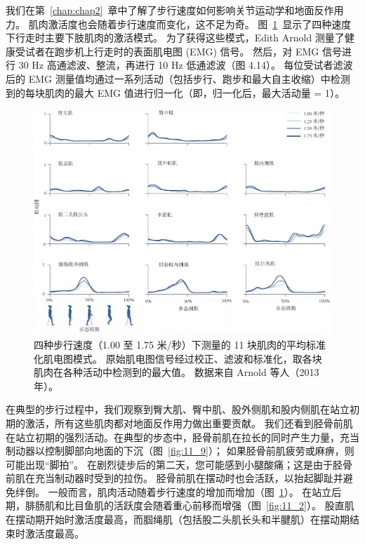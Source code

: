 我们在第~\ref{chap:chap2}~章中了解了步行速度如何影响关节运动学和地面反作用力。
肌肉激活度也会随着步行速度而变化，这不足为奇。
图~\ref{fig:11_8}~显示了四种速度下行走时主要下肢肌肉的激活模式。
为了获得这些模式，Edith Arnold 测量了健康受试者在跑步机上行走时的表面肌电图 (EMG) 信号。
然后，对 EMG 信号进行 30 Hz 高通滤波、整流，再进行 10 Hz 低通滤波（图 4.14）。
每位受试者滤波后的 EMG 测量值均通过一系列活动（包括步行、跑步和最大自主收缩）中检测到的每块肌肉的最大 EMG 值进行归一化（即，归一化后，最大活动量 = 1）。


\begin{figure}[!htb]
	\centering
	\includegraphics[width=1.0\linewidth]{chap11/11_8}
	\caption{四种步行速度（1.00 至 1.75 米/秒）下测量的 11 块肌肉的平均标准化肌电图模式。
		原始肌电图信号经过校正、滤波和标准化，取各块肌肉在各种活动中检测到的最大值。
		数据来自 Arnold 等人（2013 年）。 \label{fig:11_8}}
\end{figure}


在典型的步行过程中，我们观察到臀大肌、臀中肌、股外侧肌和股内侧肌在站立初期的激活，所有这些肌肉都对地面反作用力做出重要贡献。
我们还看到胫骨前肌在站立初期的强烈活动。在典型的步态中，胫骨前肌在拉长的同时产生力量，充当制动器以控制脚部向地面的下沉（图~\ref{fig:11_9}）；
如果胫骨前肌疲劳或麻痹，则可能出现“脚拍”。
在剧烈徒步后的第二天，您可能感到小腿酸痛；这是由于胫骨前肌在充当制动器时受到的拉伤。
胫骨前肌在摆动时也会活跃，以抬起脚趾并避免绊倒。
一般而言，肌肉活动随着步行速度的增加而增加（图~\ref{fig:11_8}）。
在站立后期，腓肠肌和比目鱼肌的活跃度会随着重心前移而增强（图~\ref{fig:11_2}）。
股直肌在摆动期开始时激活度最高，而腘绳肌（包括股二头肌长头和半腱肌）在摆动期结束时激活度最高。


